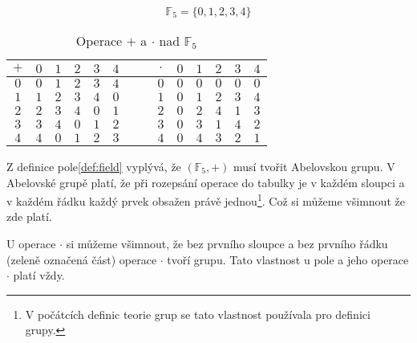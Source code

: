 \begin{example}
    $$\mathbb{F}_5 = \{0, 1, 2, 3, 4\}$$
\begin{table}[h]
    \centering
    \begin{tabular}{|c|c|c|c|c|c|c|c|c|c|c|c|c|c|}
    \hline
    $+$ &
      $0$ &
      $1$ &
      $2$ &
      $3$ &
      $4$ &
       &
       &
      $\cdot$ &
      $0$ &
      $1$ &
      $2$ &
      $3$ &
      $4$ \\ \hline
    $0$ &
      $0$ &
      $1$ &
      $2$ &
      $3$ &
      $4$ &
       &
       &
      $0$ &
      $0$ &
      $0$ &
      $0$ &
      $0$ &
      $0$ \\ \hline
    $1$ &
      $1$ &
      \cellcolor[HTML]{FFFFFF}$2$ &
      \cellcolor[HTML]{FFFFFF}$3$ &
      \cellcolor[HTML]{FFFFFF}$4$ &
      \cellcolor[HTML]{FFFFFF}$0$ &
       &
       &
      $1$ &
      $0$ &
      \cellcolor[HTML]{34FF34}$1$ &
      \cellcolor[HTML]{34FF34}$2$ &
      \cellcolor[HTML]{34FF34}$3$ &
      \cellcolor[HTML]{34FF34}$4$ \\ \hline
    $2$ &
      $2$ &
      \cellcolor[HTML]{FFFFFF}$3$ &
      \cellcolor[HTML]{FFFFFF}$4$ &
      \cellcolor[HTML]{FFFFFF}$0$ &
      \cellcolor[HTML]{FFFFFF}$1$ &
       &
       &
      $2$ &
      $0$ &
      \cellcolor[HTML]{34FF34}$2$ &
      \cellcolor[HTML]{34FF34}$4$ &
      \cellcolor[HTML]{34FF34}$1$ &
      \cellcolor[HTML]{34FF34}$3$ \\ \hline
    $3$ &
      $3$ &
      \cellcolor[HTML]{FFFFFF}$4$ &
      \cellcolor[HTML]{FFFFFF}$0$ &
      \cellcolor[HTML]{FFFFFF}$1$ &
      \cellcolor[HTML]{FFFFFF}$2$ &
       &
       &
      $3$ &
      $0$ &
      \cellcolor[HTML]{34FF34}$3$ &
      \cellcolor[HTML]{34FF34}$1$ &
      \cellcolor[HTML]{34FF34}$4$ &
      \cellcolor[HTML]{34FF34}$2$ \\ \hline
    $4$ &
      $4$ &
      \cellcolor[HTML]{FFFFFF}$0$ &
      \cellcolor[HTML]{FFFFFF}$1$ &
      \cellcolor[HTML]{FFFFFF}$2$ &
      \cellcolor[HTML]{FFFFFF}$3$ &
       &
       &
      $4$ &
      $0$ &
      \cellcolor[HTML]{34FF34}$4$ &
      \cellcolor[HTML]{34FF34}$3$ &
      \cellcolor[HTML]{34FF34}$2$ &
      \cellcolor[HTML]{34FF34}$1$ \\ \hline
    \end{tabular}
    \caption{Operace $+$ a $\cdot$ nad $\mathbb{F}_{5}$}
    \label{tab:F5}
    \end{table}

    Z definice pole\ref{def:field} vyplývá, že $(\mathbb{F}_5, +)$ musí tvořit Abelovskou grupu.
    V Abelovské grupě platí, že při rozepsání operace do tabulky je v každém sloupci
    a v každém řádku každý prvek obsažen právě jednou\footnote{V počátcích definic
    teorie grup se tato vlastnost používala pro definici grupy.}. Což si můžeme všimnout
    že zde platí.

    U operace $\cdot$ si můžeme všimnout, že bez prvního sloupce a bez prvního řádku
    (zeleně označená část) operace $\cdot$ tvoří grupu. Tato vlastnost u pole a jeho
    operace $\cdot$ platí vždy.
\end{example}

